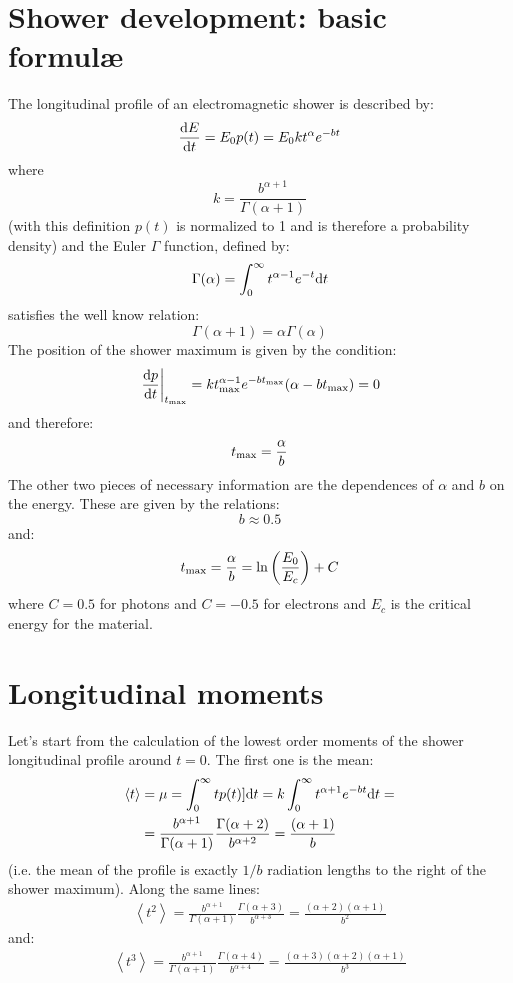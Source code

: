 \documentclass[a4paper,11pt]{article}
\newcommand{\firstder}[2]{\frac{{\rm d}#1}{{\rm d}#2}}
\newcommand{\tmax}{t_{\rm max}}
\newcommand{\diff}{{\rm d}}
\begin{document}
\section{Shower development: basic formul\ae}

The longitudinal profile of an electromagnetic shower is described by:
\begin{equation}
\firstder{E}{t} = E_0 p(t) = E_0 k t^\alpha e^{-bt}
\end{equation}
where
$$
k = \frac{b^{\alpha + 1}}{\Gamma(\alpha + 1)}
$$
(with this definition $p(t)$ is normalized to 1 and is therefore a probability
density) and the Euler $\Gamma$ function, defined by:
$$
\Gamma(\alpha) = \int_{0}^\infty t^{\alpha - 1} e^{-t} \diff t
$$
satisfies the well know relation:
$$
\Gamma(\alpha + 1) = \alpha \Gamma(\alpha)
$$
The position of the shower maximum is given by the condition:
$$
\left.\firstder{p}{t}\right|_{\tmax} =
k \tmax^{\alpha - 1} e^{-b\tmax} (\alpha  - b\tmax) = 0
$$
and therefore:
\begin{equation}
\tmax = \frac{\alpha}{b}
\end{equation}
The other two pieces of necessary information are the dependences of $\alpha$
and $b$ on the energy. These are given by the relations:
\begin{equation}
b \approx 0.5
\end{equation}
and:
\begin{equation}
\tmax = \frac{\alpha}{b} = \ln\left(\frac{E_0}{E_c}\right) + C
\end{equation}
where $C=0.5$ for photons and $C=-0.5$ for electrons and $E_c$ is the critical
energy for the material.


\section{Longitudinal moments}

Let's start from the calculation of the lowest order moments of the shower
longitudinal profile around $t=0$. The first one is the mean:
\begin{align}
\left< t \right> &= \mu = \int_{0}^\infty t p(t) ] \diff t =
k \int_{0}^\infty t^{\alpha + 1} e^{-bt} \diff t =\nonumber\\
&= \frac{b^{\alpha + 1}}{\Gamma(\alpha + 1)}
\frac{\Gamma(\alpha + 2)}{b^{\alpha + 2}} = \frac{(\alpha + 1)}{b}
\end{align}
(i.e. the mean of the profile is exactly $1/b$ radiation lengths to the
right of the shower maximum). Along the same lines:
\begin{align}
\left< t^2 \right> = \frac{b^{\alpha + 1}}{\Gamma(\alpha + 1)}
\frac{\Gamma(\alpha + 3)}{b^{\alpha + 3}} =
\frac{(\alpha + 2)(\alpha + 1)}{b^2}
\end{align}
and:
\begin{align}
\left< t^3 \right> = \frac{b^{\alpha + 1}}{\Gamma(\alpha + 1)}
\frac{\Gamma(\alpha + 4)}{b^{\alpha + 4}} =
\frac{(\alpha + 3)(\alpha + 2)(\alpha + 1)}{b^3}
\end{align}
\end{document}
